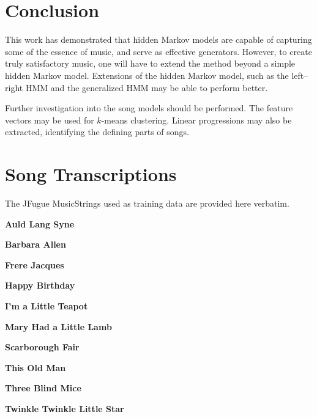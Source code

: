 \documentclass[12pt]{article}
\begin{document}
\section{Conclusion}

This work has demonstrated that hidden Markov models are capable of capturing
some of the essence of music, and serve as effective generators. However, to
create truly satisfactory music, one will have to extend the method beyond a
simple hidden Markov model. Extensions of the hidden Markov model, such as the
left--right HMM \parencite{rabiner1989} and the 
generalized HMM \parencite{kulp1996} may be able to perform better.

Further investigation into the song models should be performed. The feature
vectors may be used for $k$-means clustering. Linear progressions may also be
extracted, identifying the defining parts of songs. 



\printbibliography


\appendix

\section{Song Transcriptions}
\label{app:melodies}

The JFugue MusicStrings used as training data are provided here verbatim.

\textbf{Auld Lang Syne}


\textbf{Barbara Allen}


\textbf{Frere Jacques}


\textbf{Happy Birthday}


\textbf{I'm a Little Teapot}


\textbf{Mary Had a Little Lamb}


\textbf{Scarborough Fair}


\textbf{This Old Man}


\textbf{Three Blind Mice}


\textbf{Twinkle Twinkle Little Star}

\end{document}

